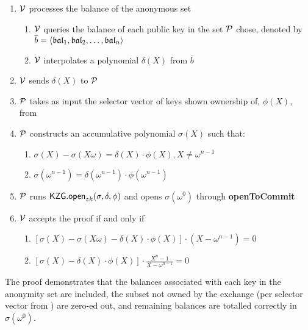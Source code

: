 

\begin{Protocol*}[t!]
\begin{framed}
\footnotesize


\begin{enumerate}
	\item $\mathcal{V}$ processes the balance of the anonymous set
	\begin{enumerate}
		\item $\mathcal{V}$ queries the balance of each public key in the set $\mathcal{P}$ chose, denoted by $\overline{b}=\left \langle \mathfrak{bal}_1,\mathfrak{bal}_2,\dots,\mathfrak{bal}_n \right \rangle$
		\item $\mathcal{V}$ interpolates a polynomial $\delta(X)$ from $\overline{b}$
	\end{enumerate}
	\item $\mathcal{V}$ sends $\delta(X)$ to $\mathcal{P}$
	\item $\mathcal{P}$ takes as input the selector vector of keys shown ownership of, $\phi(X)$, from \bootstrap 
	\item $\mathcal{P}$ constructs an accumulative polynomial $\sigma(X)$ such that:
		\begin{enumerate}
	\item $\sigma(X)-\sigma(X\omega)=\delta(X)\cdot\phi(X),X\ne{\omega^{n-1}}$
	\item $\sigma(\omega^{n-1})=\delta(\omega^{n-1})\cdot\phi(\omega^{n-1})$
		\end{enumerate}
	\item $\mathcal{P}$ runs $\mathsf{KZG.open}_{zk}(\sigma,\delta,\phi)$ and opens $\sigma(\omega^0)$ through \textbf{openToCommit}
	\item $\mathcal{V}$ accepts the proof if and only if
	\begin{enumerate}
		\item $[\sigma(X)-\sigma(X\omega)-\delta(X)\cdot{\phi(X)}]\cdot(X-\omega^{n-1})=0$
		\item $[\sigma(X)-\delta(X)\cdot{\phi(X)}]\cdot\frac{X^n-1}{X-\omega^{n-1}}=0$
	\end{enumerate}
\end{enumerate}	


\normalsize	
\end{framed}
\caption{The \poa proof demonstrates that the balances associated with each key in the anonymity set are included, the subset not owned by the exchange (per selector vector from \bootstrap) are zero-ed out, and remaining balances are totalled correctly in $\sigma(\omega^0)$. \label{alg:poa}}
\end{Protocol*}
